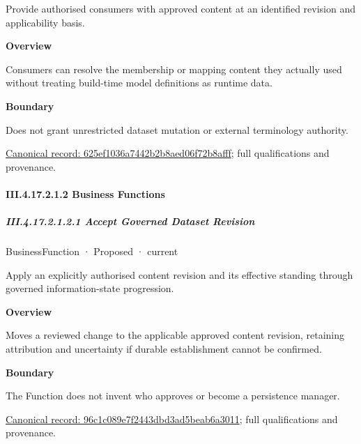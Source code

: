 Provide authorised consumers with approved content at an identified revision and applicability basis.



\textbf{Overview}



Consumers can resolve the membership or mapping content they actually used without treating build-time model definitions as runtime data.



\textbf{Boundary}



Does not grant unrestricted dataset mutation or external terminology authority.


{\footnotesize \href{../../../../../../../continuum/business/business-service/625ef1036a7442b2b8aed06f72b8afff.md}{Canonical record: 625ef1036a7442b2b8aed06f72b8afff}; full qualifications and provenance.}\par
\paragraph*{III.4.17.2.1.2 Business Functions}
\label{navigation:III.4.17.2.1.2}

\subparagraph*{III.4.17.2.1.2.1 Accept Governed Dataset Revision}
\label{navigation:III.4.17.2.1.2.1}

\label{element:96c1c089e7f2443dbd3ad5beab6a3011}
{\small BusinessFunction · Proposed · current}\par

Apply an explicitly authorised content revision and its effective standing through governed information-state progression.



\textbf{Overview}



Moves a reviewed change to the applicable approved content revision, retaining attribution and uncertainty if durable establishment cannot be confirmed.



\textbf{Boundary}



The Function does not invent who approves or become a persistence manager.


{\footnotesize \href{../../../../../../../continuum/business/business-function/96c1c089e7f2443dbd3ad5beab6a3011.md}{Canonical record: 96c1c089e7f2443dbd3ad5beab6a3011}; full qualifications and provenance.}\par

